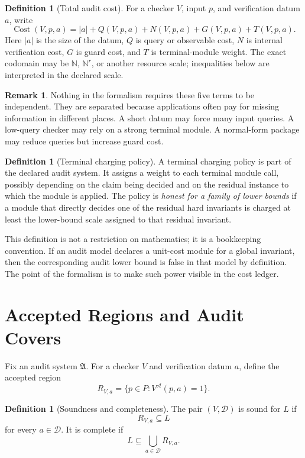 \documentclass[11pt]{article}
\theoremstyle{definition}
\newtheorem{definition}[theorem]{Definition}
\newtheorem{remark}[theorem]{Remark}
\DeclareMathOperator{\Cost}{Cost}
\begin{document}
\begin{definition}[Total audit cost]
For a checker \(V\), input \(p\), and verification datum \(a\), write
\[
\Cost(V,p,a)=|a|+Q(V,p,a)+N(V,p,a)+G(V,p,a)+T(V,p,a).
\]
Here \(|a|\) is the size of the datum, \(Q\) is query or observable cost, \(N\) is internal verification cost, \(G\) is guard cost, and \(T\) is terminal-module weight. The exact codomain may be \(\mathbb N\), \(\mathbb N^r\), or another resource scale; inequalities below are interpreted in the declared scale.
\end{definition}

\begin{remark}
Nothing in the formalism requires these five terms to be independent. They are separated because applications often pay for missing information in different places. A short datum may force many input queries. A low-query checker may rely on a strong terminal module. A normal-form package may reduce queries but increase guard cost.
\end{remark}

\begin{definition}[Terminal charging policy]
A terminal charging policy is part of the declared audit system. It assigns a weight to each terminal module call, possibly depending on the claim being decided and on the residual instance to which the module is applied. The policy is \emph{honest for a family of lower bounds} if a module that directly decides one of the residual hard invariants is charged at least the lower-bound scale assigned to that residual invariant.
\end{definition}

This definition is not a restriction on mathematics; it is a bookkeeping convention. If an audit model declares a unit-cost module for a global invariant, then the corresponding audit lower bound is false in that model by definition. The point of the formalism is to make such power visible in the cost ledger.

\section{Accepted Regions and Audit Covers}

Fix an audit system \(\mathfrak A\). For a checker \(V\) and verification datum \(a\), define the accepted region
\[
R_{V,a}=\{p\in P:V^{\mathcal A}(p,a)=1\}.
\]

\begin{definition}[Soundness and completeness]
The pair \((V,\mathcal D)\) is sound for \(L\) if
\[
R_{V,a}\subseteq L
\]
for every \(a\in\mathcal D\). It is complete if
\[
L\subseteq \bigcup_{a\in\mathcal D}R_{V,a}.
\]
\end{definition}
\end{document}
